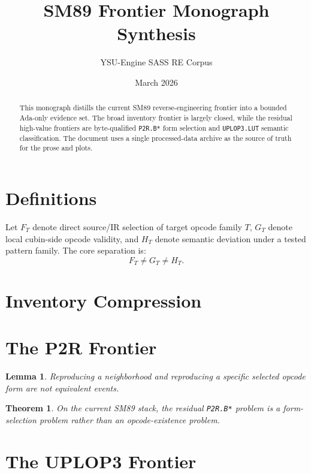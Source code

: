 \documentclass[11pt]{article}
\title{SM89 Frontier Monograph Synthesis}
\author{YSU-Engine SASS RE Corpus}
\date{March 2026}
\newtheorem{lemma}{Lemma}
\newtheorem{theorem}{Theorem}
\begin{document}
\maketitle

\begin{abstract}
This monograph distills the current SM89 reverse-engineering frontier into a
bounded Ada-only evidence set. The broad inventory frontier is largely closed,
while the residual high-value frontiers are byte-qualified \texttt{P2R.B*} form
selection and \texttt{UPLOP3.LUT} semantic classification. The document uses a
single processed-data archive as the source of truth for the prose and plots.
\end{abstract}

\section{Definitions}
Let $F_T$ denote direct source/IR selection of target opcode family $T$,
$G_T$ denote local cubin-side opcode validity, and $H_T$ denote semantic
deviation under a tested pattern family. The core separation is:
\[
F_T \neq G_T \neq H_T.
\]

\section{Inventory Compression}
\inventorytable


\section{The P2R Frontier}
\pTwoRTable
\begin{lemma}
Reproducing a neighborhood and reproducing a specific selected opcode form are
not equivalent events.
\end{lemma}

\begin{theorem}
On the current SM89 stack, the residual \texttt{P2R.B*} problem is a
form-selection problem rather than an opcode-existence problem.
\end{theorem}



\section{The UPLOP3 Frontier}
\runtimeclass
{}\livesites
{}\pairbase
\end{document}
